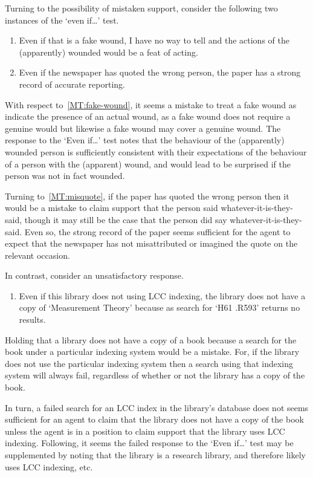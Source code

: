 \begin{note}
  Turning to the possibility of mistaken support, consider the following two instances of the `even if\dots' test.

  \begin{enumerate}[label=(MT\arabic*), ref=(MT\arabic*), series=MT_counter]
  \item\label{MT:fake-wound} Even if that is a fake wound, I have no way to tell and the actions of the (apparently) wounded would be a feat of acting.
  \item\label{MT:misquote} Even if the newspaper has quoted the wrong person, the paper has a strong record of accurate reporting.
  \end{enumerate}

  With respect to~\ref{MT:fake-wound}, it seems a mistake to treat a fake wound as indicate the presence of an actual wound, as a fake wound does not require a genuine would but likewise a fake wound may cover a genuine wound.
  The response to the `Even if\dots' test notes that the behaviour of the (apparently) wounded person is sufficiently consistent with their expectations of the behaviour of a person with the (apparent) wound, and would lead to be surprised if the person was not in fact wounded.

  Turning to~\ref{MT:misquote}, if the paper has quoted the wrong person then it would be a mistake to claim support that the person said whatever-it-is-they-said, though it may still be the case that the person did say whatever-it-is-they-said.
  Even so, the strong record of the paper seems sufficient for the agent to expect that the newspaper has not misattributed or imagined the quote on the relevant occasion.

  In contrast, consider an unsatisfactory response.

  \begin{enumerate}[label=(MT\arabic*), ref=(MT\arabic*), resume*=MT_counter]
  \item Even if this library does not using LCC indexing, the library does not have a copy of `Measurement Theory' because as search for `H61 .R593' returns no results.
  \end{enumerate}
  Holding that a library does not have a copy of a book because a search for the book under a particular indexing system would be a mistake.
  For, if the library does not use the particular indexing system then a search using that indexing system will always fail, regardless of whether or not the library has a copy of the book.

  In turn, a failed search for an LCC index in the library's database does not seems sufficient for an agent to claim that the library does not have a copy of the book unless the agent is in a position to claim support that the library uses LCC indexing.
  Following, it seems the failed response to the `Even if\dots' test may be supplemented by noting that the library is a research library, and therefore likely uses LCC indexing, etc.\
\end{note}

